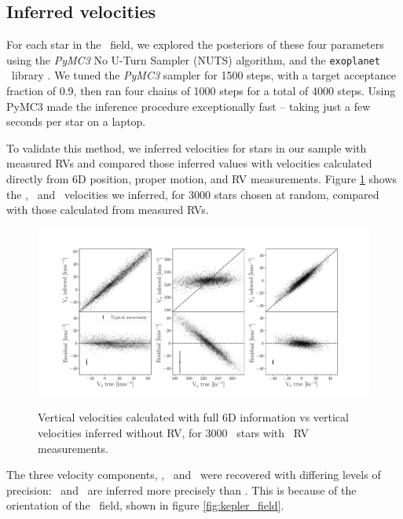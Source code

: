 
\subsection{Inferred velocities}

For each star in the \kepler\ field, we explored the posteriors of these four
parameters using the {\it PyMC3} No U-Turn Sampler (NUTS) algorithm, and the
{\tt exoplanet} \python\ library .
We tuned the {\it PyMC3} sampler for 1500 steps, with a target acceptance
fraction of 0.9, then ran four chains of 1000 steps for a total of 4000 steps.
Using PyMC3 made the inference procedure exceptionally fast -- taking just a
few seconds per star on a laptop.

To validate this method, we inferred velocities for stars in our sample with
measured RVs and compared those inferred values with velocities calculated
directly from 6D position, proper motion, and RV measurements.
Figure \ref{fig:residuals} shows the \vx, \vy\ and \vz\ velocities we
inferred, for 3000 stars chosen at random, compared with those calculated from
measured RVs.
\begin{figure}[ht!]
\caption{Vertical velocities calculated with full 6D information vs vertical
    velocities inferred without RV, for 3000 \mct\ stars with \gaia\ RV
    measurements.}
  \centering
    \includegraphics[width=1\textwidth]{residuals}
\label{fig:residuals}
\end{figure}

The three velocity components, \vx, \vy\ and \vz\ were recovered with
differing levels of precision: \vx\ and \vz\ are inferred more precisely than
\vy.
This is because of the orientation of the \kepler\ field, shown in figure
\ref{fig:kepler_field}.

